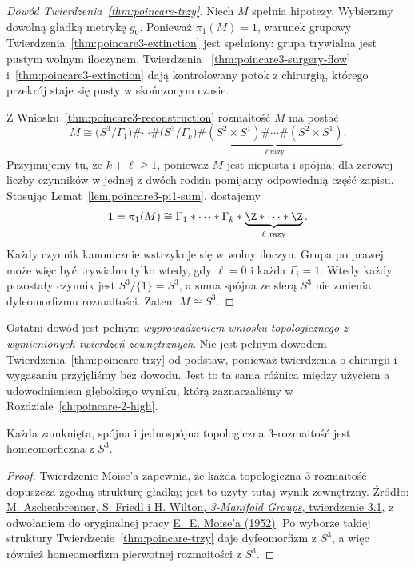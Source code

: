 \begin{proof}[Dowód Twierdzenia~\ref{thm:poincare-trzy}]
Niech $M$ spełnia hipotezy. Wybierzmy
dowolną gładką metrykę $g_0$.
Ponieważ $\pi_1(M)=1$, warunek grupowy
Twierdzenia~\ref{thm:poincare3-extinction}
jest spełniony: grupa trywialna jest
pustym wolnym iloczynem. Twierdzenia
~\ref{thm:poincare3-surgery-flow}
i~\ref{thm:poincare3-extinction} dają
kontrolowany potok z chirurgią, którego
przekrój staje się pusty w skończonym czasie.

Z Wniosku~\ref{thm:poincare3-reconstruction}
rozmaitość $M$ ma postać
\[
 M\cong\bigl(S^3/\Gamma_1\bigr)\#\cdots\#
 \bigl(S^3/\Gamma_k\bigr)
 \#\underbrace{(S^2\times S^1)\#\cdots\#
 (S^2\times S^1)}_{\ell\ \text{razy}}.
\]
Przyjmujemy tu, że $k+\ell\geq1$, ponieważ
$M$ jest niepusta i spójna; dla zerowej liczby
czynników w jednej z dwóch rodzin pomijamy
odpowiednią część zapisu.
Stosując Lemat~\ref{lem:poincare3-pi1-sum},
dostajemy
\[
 1=\pi_1(M)\cong
 \Gamma_1*\cdots*\Gamma_k*
 \underbrace{\Z*\cdots*\Z}_{\ell\ \text{razy}}.
\]
Każdy czynnik kanonicznie wstrzykuje się
w wolny iloczyn. Grupa po prawej może
więc być trywialna tylko wtedy, gdy
$\ell=0$ i każda $\Gamma_i=1$.
Wtedy każdy pozostały czynnik jest
$S^3/\{1\}=S^3$, a suma spójna
ze sferą $S^3$ nie zmienia dyfeomorfizmu
rozmaitości. Zatem $M\cong S^3$.
\end{proof}

Ostatni dowód jest pełnym \emph{wyprowadzeniem
wniosku topologicznego z wymienionych twierdzeń
zewnętrznych}. Nie jest pełnym dowodem
Twierdzenia~\ref{thm:poincare-trzy} od podstaw,
ponieważ twierdzenia o chirurgii i wygasaniu
przyjęliśmy bez dowodu. Jest to ta sama
różnica między użyciem a udowodnieniem
głębokiego wyniku, którą zaznaczaliśmy
w Rozdziale~\ref{ch:poincare-2-high}.

\begin{wniosek}
\label{cor:poincare-trzy-topologiczna}
Każda zamknięta, spójna i jednospójna topologiczna
$3$-rozmaitość jest homeomorficzna z $S^3$.
\end{wniosek}
\begin{proof}
Twierdzenie Moise'a zapewnia, że każda topologiczna
$3$-rozmaitość dopuszcza zgodną strukturę gładką;
jest to użyty tutaj wynik zewnętrzny.
Źródło: \href{https://msp.org/gtm/2015/19-1/gtm-v19-n1-p08-s.pdf}
{M. Aschenbrenner, S. Friedl i H. Wilton,
\emph{3-Manifold Groups}, twierdzenie 3.1},
z odwołaniem do oryginalnej pracy
\href{https://doi.org/10.2307/1969769}
{E.~E. Moise'a (1952)}. Po wyborze takiej struktury
Twierdzenie~\ref{thm:poincare-trzy} daje dyfeomorfizm
z $S^3$, a więc również homeomorfizm pierwotnej
rozmaitości z $S^3$.
\end{proof}

